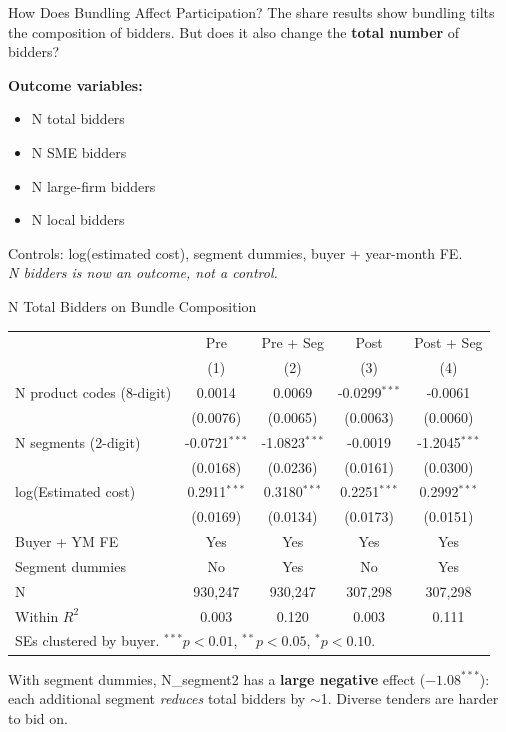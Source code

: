 \documentclass[9pt,aspectratio=169]{beamer}
\begin{document}
\begin{frame}{How Does Bundling Affect Participation?}
The share results show bundling tilts the composition of bidders. But does it also change the \textbf{total number} of bidders?

\bigskip
\textbf{Outcome variables:}
\begin{itemize}
  \item N total bidders
  \item N SME bidders
  \item N large-firm bidders
  \item N local bidders
\end{itemize}

\medskip
Controls: log(estimated cost), segment dummies, buyer + year-month FE. \\
\textit{N bidders is now an outcome, not a control.}
\end{frame}

\begin{frame}{N Total Bidders on Bundle Composition}
\centering\small
\begin{tabular}{lcccc}
\toprule
 & Pre & Pre + Seg & Post & Post + Seg \\
 & (1) & (2) & (3) & (4) \\
\midrule
N product codes (8-digit) & 0.0014 & 0.0069 & -0.0299$^{***}$ & -0.0061 \\
 & (0.0076) & (0.0065) & (0.0063) & (0.0060) \\[2pt]
N segments (2-digit) & -0.0721$^{***}$ & -1.0823$^{***}$ & -0.0019 & -1.2045$^{***}$ \\
 & (0.0168) & (0.0236) & (0.0161) & (0.0300) \\[2pt]
log(Estimated cost) & 0.2911$^{***}$ & 0.3180$^{***}$ & 0.2251$^{***}$ & 0.2992$^{***}$ \\
 & (0.0169) & (0.0134) & (0.0173) & (0.0151) \\[2pt]
\midrule
Buyer + YM FE & Yes & Yes & Yes & Yes \\
Segment dummies & No & Yes & No & Yes \\
N & 930,247 & 930,247 & 307,298 & 307,298 \\
Within $R^2$ & 0.003 & 0.120 & 0.003 & 0.111 \\
\bottomrule
\multicolumn{5}{l}{\footnotesize SEs clustered by buyer. $^{***}p<0.01$, $^{**}p<0.05$, $^{*}p<0.10$.} \\
\end{tabular}

\medskip
\small With segment dummies, N\_segment2 has a \textbf{large negative} effect ($-1.08^{***}$): each additional segment \textit{reduces} total bidders by $\sim$1. Diverse tenders are harder to bid on.
\end{frame}
\end{document}

